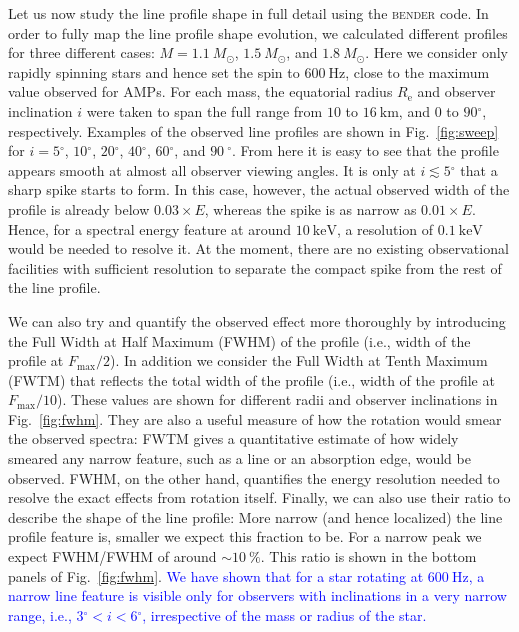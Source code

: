\documentclass{aa}
\newcommand{\refe}[1]{\textcolor{blue}{{#1}}}
\newcommand{\Msun}{\ensuremath{M_{\odot}}}
\renewcommand{\deg}{\ensuremath{^{\circ}}}
\begin{document}
Let us now study the line profile shape in full detail using the \textsc{bender} code.
In order to fully map the line profile shape evolution, we calculated different profiles for three different cases: $M=1.1~\Msun$, $1.5~\Msun$, and $1.8~\Msun$.
Here we consider only rapidly spinning stars and hence set the spin to $600~\mathrm{Hz}$, close to the maximum value observed for AMPs.
For each mass, the equatorial radius $R_{\mathrm{e}}$ and observer inclination $i$ were taken to span the full range from $10$ to $16~\mathrm{km}$, and $0$ to $90\deg$, respectively.
Examples of the observed line profiles are shown in Fig.~\ref{fig:sweep} for $i=5\deg$, $10\deg$, $20\deg$, $40\deg$, $60\deg$, and $90~\deg$.
From here it is easy to see that the profile appears smooth at almost all observer viewing angles.
It is only at $i \lesssim 5\deg$ that a sharp spike starts to form.
In this case, however, the actual observed width of the profile is already below $0.03 \times E$, whereas the spike is as narrow as $0.01 \times E$.
Hence, for a spectral energy feature at around $10~\mathrm{keV}$, a resolution of $0.1~\mathrm{keV}$ would be needed to resolve it.
At the moment, there are no existing observational facilities with sufficient resolution to separate the compact spike from the rest of the line profile.

We can also try and quantify the observed effect more thoroughly by introducing the Full Width at Half Maximum (FWHM) of the profile (i.e., width of the profile at $F_{\mathrm{max}}/2$).
In addition we consider the Full Width at Tenth Maximum (FWTM) that reflects the total width of the profile (i.e., width of the profile at $F_{\mathrm{max}}/10$).
These values are shown for different radii and observer inclinations in Fig.~\ref{fig:fwhm}.
They are also a useful measure of how the rotation would smear the observed spectra:
FWTM gives a quantitative estimate of how widely smeared any narrow feature, such as a line or an absorption edge, would be observed.
FWHM, on the other hand, quantifies the energy resolution needed to resolve the exact effects from rotation itself.
Finally, we can also use their ratio to describe the shape of the line profile:
More narrow (and hence localized) the line profile feature is, smaller we expect this fraction to be.
For a narrow peak we expect FWHM/FWHM of around $\sim 10~\%$.
This ratio is shown in the bottom panels of Fig.~\ref{fig:fwhm}.
\refe{ We have shown that for a star rotating at $600~\mathrm{Hz}$, a narrow line feature is visible only for observers with inclinations in a very narrow range, i.e., $3\deg  < i < 6\deg$, irrespective of the mass or radius of the star.}
\end{document}
